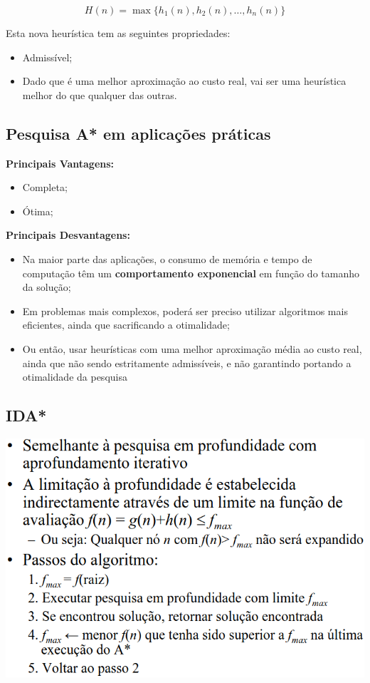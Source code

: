 \documentclass{article}
\begin{document}
\[ H(n) = \max \{ h_1(n), h_2(n), \dots, h_n(n) \} \]

Esta nova heurística tem as seguintes propriedades:
\begin{itemize}
  \item Admissível;
  \item Dado que é uma melhor aproximação ao custo real, vai ser
  uma heurística melhor do que qualquer das outras.
\end{itemize}

\subsection{Pesquisa A* em aplicações práticas}

\begin{flushleft}
  \textbf{Principais Vantagens:}
  \begin{itemize}
    \item Completa;
    \item Ótima;
  \end{itemize}

  \vspace{2mm}

  \textbf{Principais Desvantagens:}
  \begin{itemize}
    \item Na maior parte das aplicações, o consumo de memória e tempo de
    computação têm um \textbf{comportamento exponencial} em função do tamanho
    da solução;
    \item Em problemas mais complexos, poderá ser preciso utilizar algoritmos
    mais eficientes, ainda que sacrificando a otimalidade;
    \item Ou então, usar heurísticas com uma melhor aproximação média ao custo
    real, ainda que não sendo estritamente admissíveis, e não garantindo
    portando a otimalidade da pesquisa
  \end{itemize}
\end{flushleft}

\pagebreak

\subsection{IDA*}

\includegraphics[scale=0.35]{58}
\end{document}
